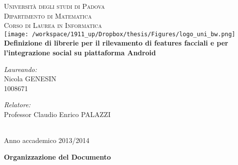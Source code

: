 \documentclass[10pt, a4paper, oneside]{Thesis} %
\begin{document}
\begin{titlepage}
\begin{center}


\vspace*{10 mm}
\textsc{\LARGE Università degli studi di Padova}\\[0.5cm] %
\textsc{\Large Dipartimento di Matematica \\
Corso di Laurea in Informatica}\\[1.0cm] %

\texttt{[image: /workspace/1911\_up/Dropbox/thesis/Figures/logo\_uni\_bw.png]}\\[1.5cm]

{\huge \bfseries Definizione di librerie per il rilevamento di features facciali e per l'integrazione social su piattaforma Android}\\[2.5cm] %
 
\begin{minipage}{0.4\textwidth}
\begin{flushleft} \large
\emph{Laureando:}\\
{Nicola GENESIN \\ 1008671} %
\end{flushleft}
\end{minipage}
\begin{minipage}{0.4\textwidth}
\begin{flushright} \large
\emph{Relatore:} \\
{Professor Claudio Enrico PALAZZI} %
\end{flushright}
\end{minipage}\\[3cm]
 
{\large Anno accademico 2013/2014}\\[4cm] %

\vfill
\end{center}
\end{titlepage}

\clearpage
\newpage
\thispagestyle{empty}
\mbox{}
\clearpage

\vspace*{7cm}

\textbf{Organizzazione del Documento}\\
\end{document}
